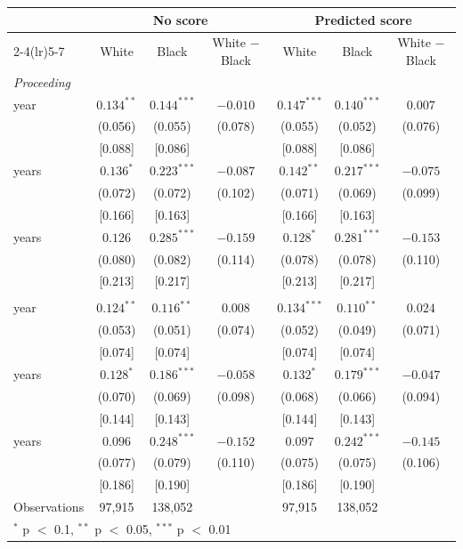 \begin{tabular}{lcccccc}
\toprule
 & \multicolumn{3}{c}{No score} & \multicolumn{3}{c}{Predicted score} \\
\cmidrule(lr){2-4}\cmidrule(lr){5-7}
 & White & Black & White $-$ Black & White & Black & White $-$ Black \\
\midrule
\multicolumn{7}{l}{\textit{Proceeding}} \\
\quad 1 year & $0.134^{**}$ & $0.144^{***}$ & $-0.010$ & $0.147^{***}$ & $0.140^{***}$ & $0.007$ \\
 & (0.056) & (0.055) & (0.078) & (0.055) & (0.052) & (0.076) \\
 & [0.088] & [0.086] &  & [0.088] & [0.086] &  \\
\quad 2 years & $0.136^{*}$ & $0.223^{***}$ & $-0.087$ & $0.142^{**}$ & $0.217^{***}$ & $-0.075$ \\
 & (0.072) & (0.072) & (0.102) & (0.071) & (0.069) & (0.099) \\
 & [0.166] & [0.163] &  & [0.166] & [0.163] &  \\
\quad 3 years & $0.126$ & $0.285^{***}$ & $-0.159$ & $0.128^{*}$ & $0.281^{***}$ & $-0.153$ \\
 & (0.080) & (0.082) & (0.114) & (0.078) & (0.078) & (0.110) \\
 & [0.213] & [0.217] &  & [0.213] & [0.217] &  \\
\addlinespace
\multicolumn{7}{l}{\textit{Revoked}} \\
\quad 1 year & $0.124^{**}$ & $0.116^{**}$ & $0.008$ & $0.134^{***}$ & $0.110^{**}$ & $0.024$ \\
 & (0.053) & (0.051) & (0.074) & (0.052) & (0.049) & (0.071) \\
 & [0.074] & [0.074] &  & [0.074] & [0.074] &  \\
\quad 2 years & $0.128^{*}$ & $0.186^{***}$ & $-0.058$ & $0.132^{*}$ & $0.179^{***}$ & $-0.047$ \\
 & (0.070) & (0.069) & (0.098) & (0.068) & (0.066) & (0.094) \\
 & [0.144] & [0.143] &  & [0.144] & [0.143] &  \\
\quad 3 years & $0.096$ & $0.248^{***}$ & $-0.152$ & $0.097$ & $0.242^{***}$ & $-0.145$ \\
 & (0.077) & (0.079) & (0.110) & (0.075) & (0.075) & (0.106) \\
 & [0.186] & [0.190] &  & [0.186] & [0.190] &  \\
\midrule
Observations & 97,915 & 138,052 &  & 97,915 & 138,052 &  \\
\bottomrule
\multicolumn{7}{l}{\footnotesize $^{*}$ p $<$ 0.1, $^{**}$ p $<$ 0.05, $^{***}$ p $<$ 0.01} \\
\end{tabular}
